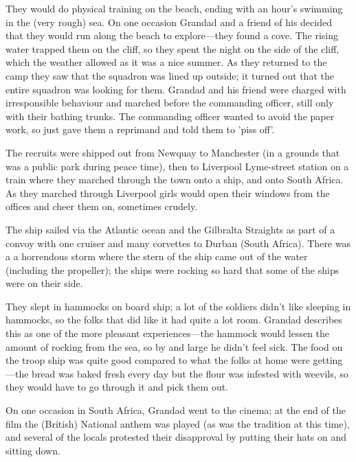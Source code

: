 They would do physical training on the beach, ending with an hour's swimming in the (very rough) sea.
On one occasion Grandad and a friend of his decided that they would run along the beach to explore---they found a
cove. The rising water trapped them on the cliff,  so they spent the night on the side of the cliff, which the
weather allowed as it was a nice summer.  As they returned to the camp they saw that the squadron was lined up outside;
it turned out that the entire squadron was looking for them. Grandad and his friend
were charged with irresponsible behaviour and marched before the commanding officer, still
only with their bathing trunks. The commanding officer wanted to avoid the paper work, so just
gave them a reprimand and told them to 'piss off'.

The recruits were shipped out from Newquay to Manchester (in a grounds that was a public park during peace
time), then to Liverpool Lyme-street station on a train where they marched through the town onto a ship,
and onto South Africa.  As they marched through Liverpool girls would open their windows from the offices and
cheer them on, sometimes crudely.

The ship sailed via the Atlantic ocean and the Gilbralta Straights as part of a convoy with one cruiser and many corvettes to Durban (South Africa).
There was a a horrendous storm where the stern of the ship came out of the water (including the propeller);
the ships were rocking so hard that some of the ships were on their side.

They slept in hammocks on board ship; a lot of the soldiers
didn't like sleeping in hammocks, so the folks that did like it had quite a lot room. Grandad describes this as
one of the more pleasant experiences---the hammock would lessen the amount of rocking from the
sea, so by and large he didn't feel sick. The food on the troop ship was quite good compared
to what the folks at home were getting---the bread was baked fresh every day but the flour was
infested with weevils, so they would have to go through it and pick them out.

\begin{figure}
	\centering
\end{figure}
On one occasion in South Africa, Grandad went to the cinema; at the end of the film
the (British) National anthem was played (as was the tradition at this time), and several of the
locals protested their disapproval by putting their hats on and sitting down.

